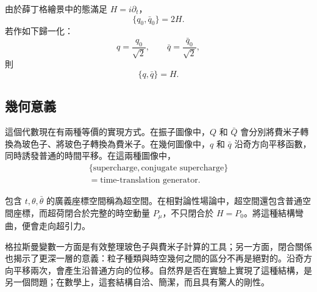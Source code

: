 由於薛丁格繪景中的態滿足 \(H=i\partial_t\)，
\begin{equation}
\{q_0,\bar q_0\}=2H.
\end{equation}
若作如下歸一化：
\begin{equation}
q=\frac{q_0}{\sqrt2},
\qquad
\bar q=\frac{\bar q_0}{\sqrt2},
\end{equation}
則
\begin{equation}
\boxed{\{q,\bar q\}=H.}
\end{equation}

\begin{classroomqa}
\end{classroomqa}

\begin{classroomqa}
\end{classroomqa}


\subsection{幾何意義}

這個代數現在有兩種等價的實現方式。在振子圖像中，\(Q\) 和 \(\bar Q\) 會分別將費米子轉換為玻色子、將玻色子轉換為費米子。在幾何圖像中，\(q\) 和 \(\bar q\) 沿奇方向平移函數，同時誘發普通的時間平移。在這兩種圖像中，
\begin{equation}
\begin{gathered}
\{\text{supercharge},\text{conjugate supercharge}\}\\
=\text{time-translation generator}.
\end{gathered}
\end{equation}

包含 \(t,\theta,\bar\theta\) 的廣義座標空間稱為超空間。在相對論性場論中，超空間還包含普通空間座標，而超荷閉合於完整的時空動量 \(P_\mu\)，不只閉合於 \(H=P_0\)。將這種結構彎曲，便會走向超引力。

格拉斯曼變數一方面是有效整理玻色子與費米子計算的工具；另一方面，閉合關係也揭示了更深一層的意義：粒子種類與時空幾何之間的區分不再是絕對的。沿奇方向平移兩次，會產生沿普通方向的位移。自然界是否在實驗上實現了這種結構，是另一個問題；在數學上，這套結構自洽、簡潔，而且具有驚人的剛性。
